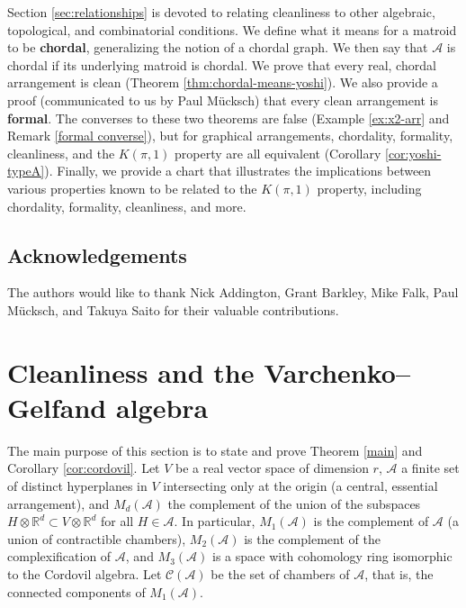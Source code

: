 \documentclass[11pt]{article}
\theoremstyle{definition}
\newcommand{\R}{{\mathbb{R}}}
\newcommand{\<}{\left<}
\renewcommand{\>}{\right>}
\newcommand{\cA}{\mathcal{A}}
\newcommand{\cC}{\mathcal{C}}
\begin{document}
Section \ref{sec:relationships} is devoted to relating cleanliness to other algebraic, topological, and combinatorial conditions.  We define what it means
for a matroid to be {\bf chordal}, generalizing the notion of a chordal graph.  We then say that $\cA$ is chordal if its underlying matroid is chordal.
We prove that every real, chordal arrangement is clean (Theorem \ref{thm:chordal-means-yoshi}).   
We also provide a proof (communicated to us by Paul M\"ucksch) that every clean arrangement is {\bf formal}.
The converses to these two theorems are false (Example \ref{ex:x2-arr} and Remark \ref{formal converse}), but for graphical arrangements,
chordality, formality, cleanliness, and the $K(\pi,1)$ property are all equivalent (Corollary \ref{cor:yoshi-typeA}).
Finally, we provide a chart that illustrates the implications between various properties known to be related to the $K(\pi,1)$ property, including chordality, formality,
cleanliness, and more.

\subsection*{Acknowledgements}
The authors would like to thank Nick Addington, Grant Barkley, Mike Falk, Paul M\"ucksch, and Takuya Saito for their valuable contributions.


\section{Cleanliness and the Varchenko--Gelfand algebra}\label{sec:theory}
The main purpose of this section is to state and prove Theorem \ref{main} and Corollary \ref{cor:cordovil}.
Let $V$ be a real vector space of dimension $r$, $\cA$ a finite set of distinct hyperplanes in $V$ intersecting only at the origin (a {central, essential} arrangement), and
$M_d(\cA)$ the complement of the union of the subspaces $H\otimes \R^d\subset V\otimes \R^d$ for all $H\in\cA$.
In particular, $M_1(\cA)$ is the complement of $\cA$ (a union of contractible chambers), 
$M_2(\cA)$ is the complement of the complexification of $\cA$, 
and $M_3(\cA)$ is a space with cohomology ring isomorphic to the Cordovil algebra.
Let $\cC(\cA)$ be the set of chambers of $\cA$, that is, the connected components of $M_1(\cA)$.
\end{document}
